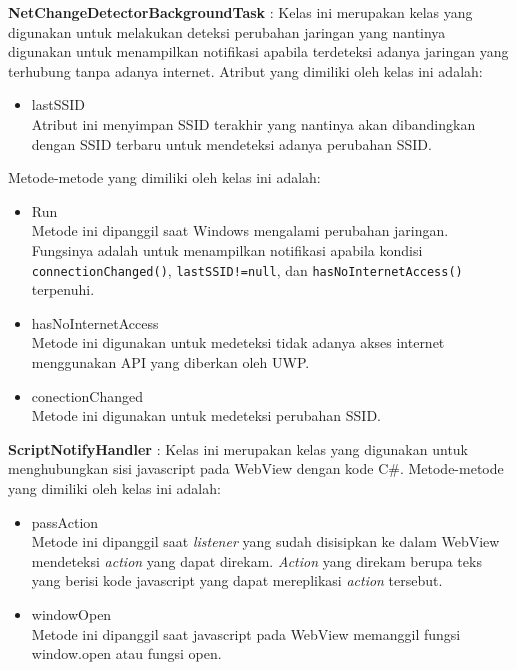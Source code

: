 \par{\textbf{NetChangeDetectorBackgroundTask} : Kelas ini merupakan kelas yang digunakan untuk melakukan deteksi perubahan jaringan yang nantinya digunakan untuk menampilkan notifikasi apabila terdeteksi adanya jaringan yang terhubung tanpa adanya internet. Atribut yang dimiliki oleh kelas ini adalah:
    \begin{itemize}
        \item{lastSSID\\Atribut ini menyimpan SSID terakhir yang nantinya akan dibandingkan dengan SSID terbaru untuk mendeteksi adanya perubahan SSID.}
    \end{itemize}
    Metode-metode yang dimiliki oleh kelas ini adalah:
    \begin{itemize}
        \item{Run\\Metode ini dipanggil saat Windows mengalami perubahan jaringan. Fungsinya adalah untuk menampilkan notifikasi apabila kondisi \texttt{connectionChanged()}, \texttt{lastSSID!=null}, dan \texttt{hasNoInternetAccess()} terpenuhi.}
        \item{hasNoInternetAccess\\Metode ini digunakan untuk medeteksi tidak adanya akses internet menggunakan API yang diberkan oleh UWP.}
        \item{conectionChanged\\Metode ini digunakan untuk medeteksi perubahan SSID.}
    \end{itemize}
}

\par{\textbf{ScriptNotifyHandler} : Kelas ini merupakan kelas yang digunakan untuk menghubungkan sisi javascript pada WebView dengan kode C\#. Metode-metode yang dimiliki oleh kelas ini adalah:
    \begin{itemize}
        \item{passAction\\Metode ini dipanggil saat \textit{listener} yang sudah disisipkan ke dalam WebView mendeteksi \textit{action} yang dapat direkam. \textit{Action} yang direkam berupa teks yang berisi kode javascript yang dapat mereplikasi \textit{action} tersebut.}
        \item{windowOpen\\Metode ini dipanggil saat javascript pada WebView memanggil fungsi window.open atau fungsi open.}
    \end{itemize}
}

